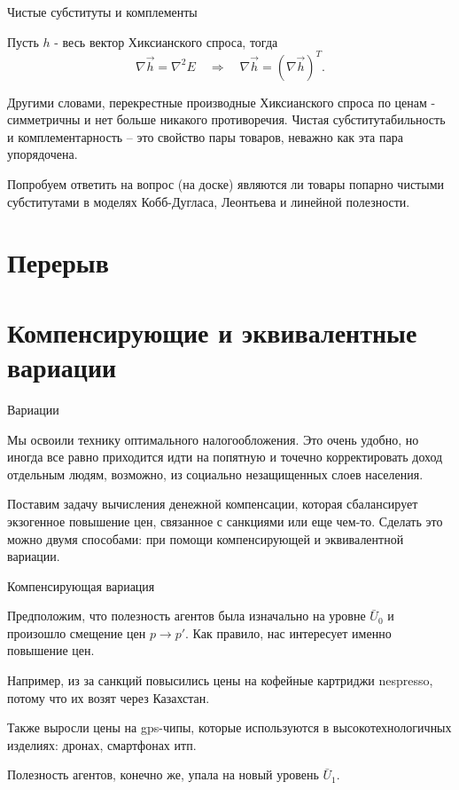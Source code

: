 \documentclass{beamer}
\begin{document}
\begin{frame}{Чистые субституты и комплементы}

\begin{lemma}
Пусть $h$ - весь вектор Хиксианского спроса, тогда
$$ \nabla \vec h = \nabla^2 E \quad \Rightarrow \quad \nabla \vec h = (\nabla \vec h)^T.$$
\end{lemma}

Другими словами, перекрестные производные Хиксианского спроса по ценам - симметричны и нет больше никакого противоречия. Чистая субститутабильность и комплементарность – это свойство пары товаров, неважно как эта пара упорядочена.

Попробуем ответить на вопрос (на доске) являются ли товары попарно чистыми субститутами в моделях Кобб-Дугласа, Леонтьева и линейной полезности.

\end{frame}

\section{Перерыв}

\section{Компенсирующие и эквивалентные вариации}

\begin{frame}{Вариации}

Мы освоили технику оптимального налогообложения. Это очень удобно, но иногда все равно приходится идти на попятную и точечно корректировать доход отдельным людям, возможно, из социально незащищенных слоев населения.

Поставим задачу вычисления денежной компенсации, которая сбалансирует экзогенное повышение цен, связанное с \alert{санкциями} или еще чем-то. Сделать это можно двумя способами: при помощи компенсирующей и эквивалентной вариации.

\end{frame}

\begin{frame}{Компенсирующая вариация}

Предположим, что полезность агентов была изначально на уровне $\bar U_0$ и произошло смещение цен $p \to p'$. Как правило, нас интересует именно повышение цен. 

Например, из за санкций повысились цены на кофейные картриджи nespresso, потому что их возят через Казахстан. 

Также выросли цены на gps-чипы, которые используются в высокотехнологичных изделиях: дронах, смартфонах итп.

Полезность агентов, конечно же, упала на новый уровень $\bar U_1$.

\end{frame}
\end{document}
